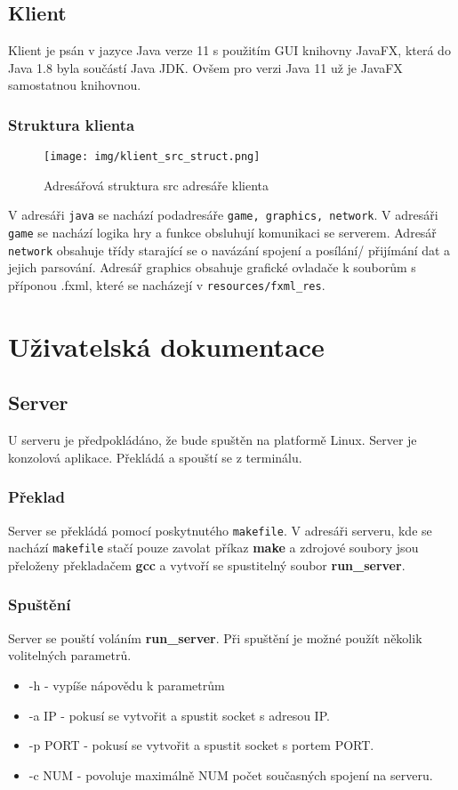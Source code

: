 \documentclass[12pt]{report}
\begin{document}
\section{Klient}
Klient je psán v jazyce Java verze 11 s použitím GUI knihovny JavaFX, která do Java 1.8 byla součástí
Java JDK. Ovšem pro verzi Java 11 už je JavaFX samostatnou knihovnou.
\subsection{Struktura klienta}
\begin{figure}[H]
	\centering
	\texttt{[image: img/klient\_src\_struct.png]}
	\caption{Adresářová struktura src adresáře klienta}
	\label{img:klient_src_struct}
\end{figure}

V adresáři \texttt{java} se nachází podadresáře \texttt{game, graphics, network}. 
V adresáři \texttt{game} se nachází logika hry a funkce obsluhují komunikaci se serverem.
Adresář \texttt{network} obsahuje třídy starající se o navázání spojení a posílání/ přijímání
dat a jejich parsování. Adresář graphics obsahuje grafické ovladače k souborům s příponou .fxml,
které se nacházejí v \texttt{resources/fxml\_res}.
%
\chapter{Uživatelská dokumentace}
\section{Server}
U serveru je předpokládáno, že bude spuštěn na platformě Linux. Server je konzolová aplikace. Překládá
a spouští se z terminálu.
%
\subsection{Překlad}
Server se překládá pomocí 
poskytnutého \texttt{makefile}. V adresáři serveru, kde se nachází \texttt{makefile} stačí
pouze zavolat příkaz \textbf{make} a zdrojové soubory jsou přeloženy překladačem \textbf{gcc}
a vytvoří se spustitelný soubor \textbf{run\_server}.
%
\subsection{Spuštění}
Server se pouští voláním \textbf{run\_server}. Při spuštění je možné použít několik volitelných parametrů.
\begin{itemize}
	\item -h - vypíše nápovědu k parametrům
	\item -a IP - pokusí se vytvořit a spustit socket s adresou IP.
	\item -p PORT - pokusí se vytvořit a spustit socket s portem PORT.
	\item -c NUM - povoluje maximálně NUM počet současných spojení na serveru.
\end{itemize}
\end{document}
